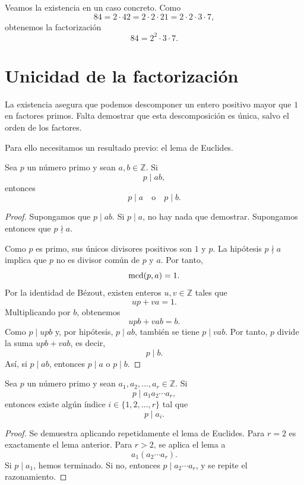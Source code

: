\begin{ejemplo}
Veamos la existencia en un caso concreto. Como
\[
  84=2\cdot 42=2\cdot 2\cdot 21=2\cdot 2\cdot 3\cdot 7,
\]
obtenemos la factorización
\[
  84=2^2\cdot 3\cdot 7.
\]
\end{ejemplo}

\section{Unicidad de la factorización}

La existencia asegura que podemos descomponer un entero positivo mayor que \(1\) en factores primos. Falta demostrar que esta descomposición es única, salvo el orden de los factores.

Para ello necesitamos un resultado previo: el lema de Euclides.

\begin{lema}
Sea \(p\) un número primo y sean \(a,b\in\mathbb{Z}\). Si
\[
  p\mid ab,
\]
entonces
\[
  p\mid a \quad \text{o} \quad p\mid b.
\]
\end{lema}

\begin{proof}
Supongamos que \(p\mid ab\). Si \(p\mid a\), no hay nada que demostrar. Supongamos entonces que \(p\nmid a\).

Como \(p\) es primo, sus únicos divisores positivos son \(1\) y \(p\). La hipótesis \(p\nmid a\) implica que \(p\) no es divisor común de \(p\) y \(a\). Por tanto,
\[
  \operatorname{mcd}(p,a)=1.
\]
Por la identidad de Bézout, existen enteros \(u,v\in\mathbb{Z}\) tales que
\[
  up+va=1.
\]
Multiplicando por \(b\), obtenemos
\[
  upb+vab=b.
\]
Como \(p\mid upb\) y, por hipótesis, \(p\mid ab\), también se tiene \(p\mid vab\). Por tanto, \(p\) divide la suma \(upb+vab\), es decir,
\[
  p\mid b.
\]
Así, si \(p\mid ab\), entonces \(p\mid a\) o \(p\mid b\).
\end{proof}

\begin{corolario}
Sea \(p\) un número primo y sean \(a_1,a_2,\ldots,a_r\in\mathbb{Z}\). Si
\[
  p\mid a_1a_2\cdots a_r,
\]
entonces existe algún índice \(i\in\{1,2,\ldots,r\}\) tal que
\[
  p\mid a_i.
\]
\end{corolario}

\begin{proof}
Se demuestra aplicando repetidamente el lema de Euclides. Para \(r=2\) es exactamente el lema anterior. Para \(r>2\), se aplica el lema a
\[
  a_1(a_2\cdots a_r).
\]
Si \(p\mid a_1\), hemos terminado. Si no, entonces \(p\mid a_2\cdots a_r\), y se repite el razonamiento.
\end{proof}

